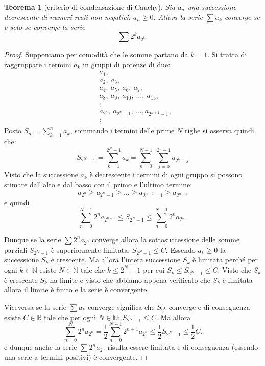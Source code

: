 \documentclass[italian,a4paper,oneside,headinclude]{scrbook}
\newcommand{\NN}{\mathbb N}
\newcommand{\RR}{\mathbb R}
\newtheorem{theorem}{Teorema}
\begin{document}
\begin{theorem}[criterio di condensazione di Cauchy]
Sia $a_n$ una successione decrescente di numeri reali non negativi:
$a_n \ge 0$.
Allora la serie $\sum a_k$ converge se e solo se converge
la serie
\[
  \sum 2^k a_{2^k}.
\]
\end{theorem}
%
\begin{proof}
Supponiamo per comodità che le somme partano da $k=1$.
Si tratta di raggruppare i termini $a_k$ in gruppi di potenze di due:
\begin{align*}
  &a_1, \\
  &a_2,\ a_3, \\
  &a_4,\ a_5,\ a_6,\ a_7, \\
  &a_8,\ a_9,\ a_{10},\ \dots,\ a_{15}, \\
  &\vdots\\
  &a_{2^n},\ a_{2^n+1},\ \dots,a_{2^{n+1}-1},\\
  &\vdots
\end{align*}
Posto $S_n = \sum_{k=1}^n a_k$,
sommando i termini delle prime $N$ righe si osserva quindi che:
\[
  S_{2^N-1}
  = \sum_{k=1}^{2^N-1} a_k
  = \sum_{n=0}^{N-1}\,\, \sum_{j=0}^{2^n-1} a_{2^k+j}
\]
Visto che la successione $a_k$ è decrescente i termini di ogni gruppo si
possono stimare dall'alto e dal basso con il primo e l'ultimo termine:
\[
  a_{2^n} \ge a_{2^n+1} \ge \dots \ge a_{2^{n+1}-1} \ge a_{2^{n+1}}
\]
e quindi
\[
\sum_{n=0}^{N-1} 2^n a_{2^{n+1}}
\le S_{2^N-1}
\le \sum_{n=0}^{N-1} 2^n a_{2^n}.
\]

Dunque se la serie $\sum 2^n a_{2^n}$ converge allora la sottosuccessione
delle somme parziali $S_{2^N-1}$ è superiormente limitata: $S_{2^N-1}\le C$.
Essendo $a_k \ge 0$ la successione $S_k$ è crescente.
Ma allora l'intera
successione $S_k$ è limitata
perché per ogni $k\in \NN$ esiste $N\in \NN$ tale che $k\le 2^N-1$ per cui
$S_k \le S_{2^N-1} \le C$.
Visto che $S_k$ è crescente $S_k$ ha limite e visto che abbiamo
appena verificato che $S_k$ è limitata allora il limite è finito
e la serie è convergente.

Viceversa se la serie $\sum a_k$ converge significa che
$S_{2^k}$ converge e di conseguenza esiste
$C\in \RR$ tale che per ogni $N \in \NN$:
 $S_{2^N-1}\le C$.
Ma allora
\[
  \sum_{n=0}^N 2^n a_{2^n}
  = \frac 1 2 \sum_{n=0}^{N-1} 2^{n+1} a_{2^n}
  \le \frac 1 2 S_{2^N-1}
  \le \frac 1 2 C.
\]
e dunque anche la serie $\sum 2^n a_{2^n}$ risulta essere limitata e
di conseguenza (essendo una serie a termini positivi) è convergente.
\end{proof}
\end{document}
